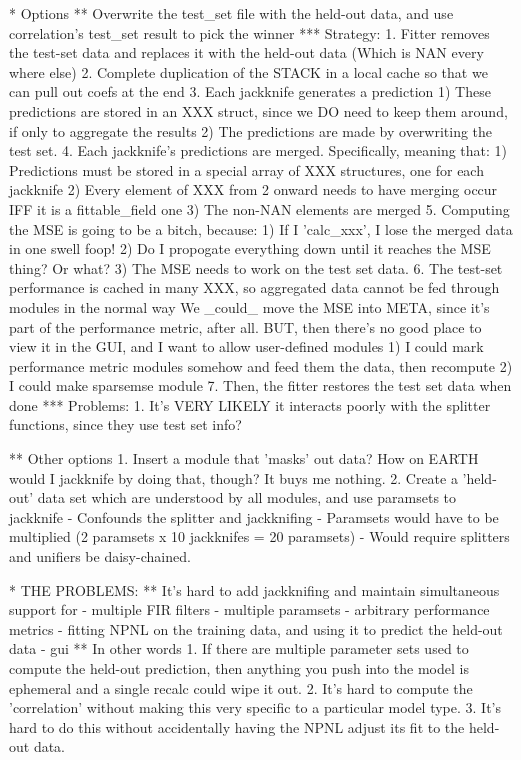 {{* Options
** Overwrite the test_set file with the held-out data, and use correlation's test_set result to pick the winner
*** Strategy:    
    1. Fitter removes the test-set data and replaces it with the held-out data (Which is NAN every where else)
    2. Complete duplication of the STACK in a local cache so that we can pull out coefs at the end
    3. Each jackknife generates a prediction
       1) These predictions are stored in an XXX struct, since we DO need to keep them around, if only to aggregate the results
       2) The predictions are made by overwriting the test set.
    4. Each jackknife's predictions are merged. Specifically, meaning that:    
       1) Predictions must be stored in a special array of XXX structures, one for each jackknife
       2) Every element of XXX from 2 onward needs to have merging occur IFF it is a fittable_field one
       3) The non-NAN elements are merged
    5. Computing the MSE is going to be a bitch, because:
       1) If I 'calc_xxx', I lose the merged data in one swell foop!
       2) Do I propogate everything down until it reaches the MSE thing? Or what?
       3) The MSE needs to work on the test set data. 
    6. The test-set performance is cached in many XXX, so aggregated data cannot be fed through modules in the normal way
       We _could_ move the MSE into META, since it's part of the performance metric, after all.
       BUT, then there's no good place to view it in the GUI, and I want to allow user-defined modules
       1) I could mark performance metric modules somehow and feed them the data, then recompute
       2) I could make sparsemse module
    7. Then, the fitter restores the test set data when done
*** Problems:
    1. It's VERY LIKELY it interacts poorly with the splitter functions, since they use test set info?

** Other options  
  1. Insert a module that 'masks' out data? How on EARTH would I jackknife by doing that, though? It buys me nothing.
  2. Create a 'held-out' data set which are understood by all modules, and use paramsets to jackknife
     - Confounds the splitter and jackknifing
     - Paramsets would have to be multiplied (2 paramsets x 10 jackknifes = 20 paramsets)
     - Would require splitters and unifiers be daisy-chained.
   
* THE PROBLEMS: 
** It's hard to add jackknifing and maintain simultaneous support for
     - multiple FIR filters
     - multiple paramsets
     - arbitrary performance metrics
     - fitting NPNL on the training data, and using it to predict the held-out data 
     - gui
** In other words
   1. If there are multiple parameter sets used to compute the held-out prediction, then anything you push into the model is ephemeral and a single recalc could wipe it out.
   2. It's hard to compute the 'correlation' without making this very specific to a particular model type.
   3. It's hard to do this without accidentally having the NPNL adjust its fit to the held-out data.


}}
